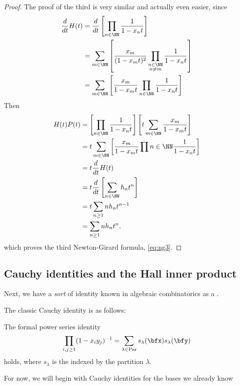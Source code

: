 \documentclass{article}
\DeclareMathOperator{\Par}{Par}
\begin{document}
\begin{proof}
    The proof of the third is very similar and actually even easier, since
    \begin{align*}
        \frac{d}{dt}H(t) &= \frac{d}{dt}\left[\prod_{n\in\NN}\frac{1}{1-x_nt}\right] \\
                         &= \sum_{m\in\NN}\left[\frac{x_m}{(1-x_mt)^2}\prod_{\substack{n\in\NN \\ n \neq m}}\frac{1}{1-x_nt}\right] \\ 
                         &= \sum_{m\in\NN}\left[\frac{x_m}{1-x_mt}\prod_{n\in\NN}\frac{1}{1-x_nt}\right]
    \end{align*}
    Then
    \begin{align*}
        H(t)P(t) &= \left[\prod_{n\in\NN}\frac{1}{1-x_nt}\right]\left[t\sum_{m\in\NN}\frac{x_m}{1-x_mt}\right] \\
                 &= t\sum_{m\in\NN}\left[\frac{x_m}{1-x_mt}\prod{n\in\NN}\frac{1}{1-x_nt}\right] \\
                 &= t\frac{d}{dt}H(t) \\
                 &= t\frac{d}{dt}\left[\sum_{n\in\NN}h_nt^n\right] \\
                 &= t\sum_{n\geq 1}nh_nt^{n-1} \\
                 &= \sum_{n\geq 1}nh_nt^n,
    \end{align*}
    which proves the third Newton-Girard formula, \eqref{eq:ng3}.
\end{proof}

\subsection{Cauchy identities and the Hall inner product}

Next, we have a \textit{sort} of identity known in algebraic combinatorics as a .

The classic Cauchy identity is as follows:

\begin{theorem}
    The formal power series identity
    \[
        \prod_{i,j \geq 1}
        (1-x_iy_j)^{-1}
        =
        \sum_{\lambda\in\Par}
        s_\lambda(\bfx)s_\lambda(\bfy)
    \]
    holds, where $s_\lambda$ is the  indexed by the partition $\lambda$.
\end{theorem}

For now, we will begin with Cauchy identities for the bases we already know
\end{document}
